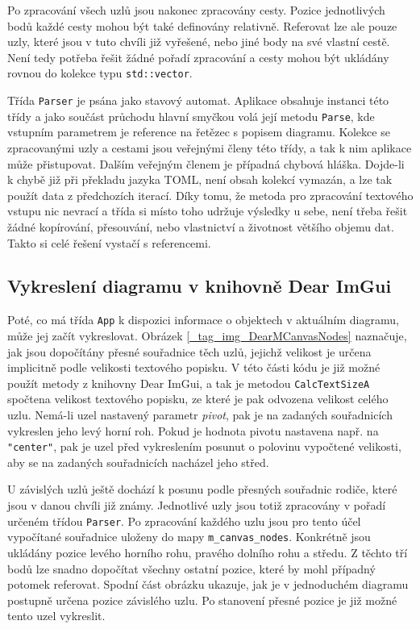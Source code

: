 \documentclass[FM,DP]{tulthesis}
\begin{document}
	Po zpracování všech uzlů jsou nakonec zpracovány cesty. Pozice jednotlivých bodů každé cesty mohou být také definovány relativně. Referovat lze ale pouze uzly, které jsou v tuto chvíli již vyřešené, nebo jiné body na své vlastní cestě. Není tedy potřeba řešit žádné pořadí zpracování a cesty mohou být ukládány rovnou do kolekce typu \texttt{std::vector}.
	
	Třída \texttt{Parser} je psána jako stavový automat. Aplikace obsahuje instanci této třídy a jako součást průchodu hlavní smyčkou volá její metodu \texttt{Parse}, kde vstupním parametrem je reference na řetězec s popisem diagramu. Kolekce se zpracovanými uzly a cestami jsou veřejnými členy této třídy, a tak k nim aplikace může přistupovat. Dalším veřejným členem je případná chybová hláška. Dojde-li k chybě již při překladu jazyka TOML, není obsah kolekcí vymazán, a lze tak použít data z předchozích iterací. Díky tomu, že metoda pro zpracování textového vstupu nic nevrací a třída si místo toho udržuje výsledky u sebe, není třeba řešit žádné kopírování, přesouvání, nebo vlastnictví a životnost většího objemu dat. Takto si celé řešení vystačí s referencemi.
	
	\subsection{Vykreslení diagramu v knihovně Dear ImGui}
	
	Poté, co má třída \texttt{App} k dispozici informace o objektech v aktuálním diagramu, může jej začít vykreslovat. Obrázek \ref{_tag_img_DearMCanvasNodes} naznačuje, jak jsou dopočítány přesné souřadnice těch uzlů, jejichž velikost je určena implicitně podle velikosti textového popisku. V této části kódu je již možné použít metody z knihovny Dear ImGui, a tak je metodou \texttt{CalcTextSizeA} spočtena velikost textového popisku, ze které je pak odvozena velikost celého uzlu. Nemá-li uzel nastavený parametr \textit{pivot}, pak je na zadaných souřadnicích vykreslen jeho levý horní roh. Pokud je hodnota pivotu nastavena např. na \texttt{"center"}, pak je uzel před vykreslením posunut o polovinu vypočtené velikosti, aby se na zadaných souřadnicích nacházel jeho střed.
	
	U závislých uzlů ještě dochází k posunu podle přesných souřadnic rodiče, které jsou v danou chvíli již známy. Jednotlivé uzly jsou totiž zpracovány v pořadí určeném třídou \texttt{Parser}. Po zpracování každého uzlu jsou pro tento účel vypočítané souřadnice uloženy do mapy \texttt{m\_canvas\_nodes}. Konkrétně jsou ukládány pozice levého horního rohu, pravého dolního rohu a středu. Z těchto tří bodů lze snadno dopočítat všechny ostatní pozice, které by mohl případný potomek referovat. Spodní část obrázku ukazuje, jak je v jednoduchém diagramu postupně určena pozice závislého uzlu. Po stanovení přesné pozice je již možné tento uzel vykreslit.
	
\end{document}
